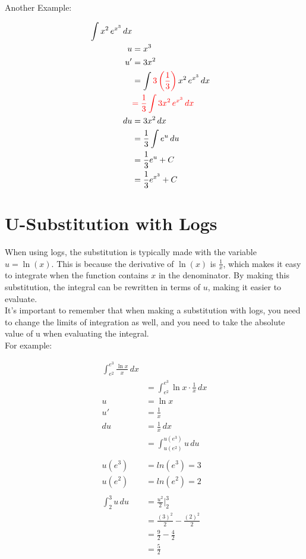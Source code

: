 \noindent Another Example:

\begin{framed}
\begin{align*}
  \int x^2 \, e^{x^3} \, dx\\
  u &= x^3\\
  u' &= 3x^2\\
  &= \int \textcolor{red}{3\left(\frac{1}{3}\right)} \, x^2 \, e^{x^3} \, dx\\
  &\textcolor{red}{= \frac{1}{3} \int 3x^2 \, e^{x^3} \, dx}\\
  du &= 3x^2 \, dx\\
  &= \frac{1}{3} \int e^u \, du\\
  &= \frac{1}{3} e^u + C\\
  &= \frac{1}{3} e^{x^3} + C
\end{align*}
\end{framed}

\newpage

\section{U-Substitution with Logs}
\noindent When using logs, the substitution is typically made with the variable 
$u = \ln(x)$. This is because the derivative of $\ln(x)$ is $\frac{1}{x}$, which 
makes it easy to integrate when the function contains $x$ in the denominator. 
By making this substitution, the integral can be rewritten in terms of $u$, 
making it easier to evaluate.\\

\noindent It's important to remember that when making a substitution with logs, 
you need to change the limits of integration as well, and you need to take the 
absolute value of u when evaluating the integral.\\

\noindent For example:

\begin{framed}
\begin{align*}
  \int_{e^2}^{e^3} \frac{\ln x}{x} \, dx\\
  &= \int_{e^2}^{e^3} \ln x \cdot \frac{1}{x} \, dx\\
  u &= \ln x\\
  u' &= \frac{1}{x}\\
  du &= \frac{1}{x} \, dx\\
  &= \int_{u(e^2)}^{u(e^3)} u \, du\\\\
  u(e^3) &= ln(e^3) = 3\\
  u(e^2) &= ln(e^2) = 2\\\\
  \int_{2}^{3} u \, du &= \frac{u^2}{2} \biggr\rvert_{2}^{3}\\
  &= \frac{(3)^2}{2} - \frac{(2)^2}{2}\\
  &= \frac{9}{2} - \frac{4}{2}\\
  &= \frac{5}{2}
\end{align*}
\end{framed}


